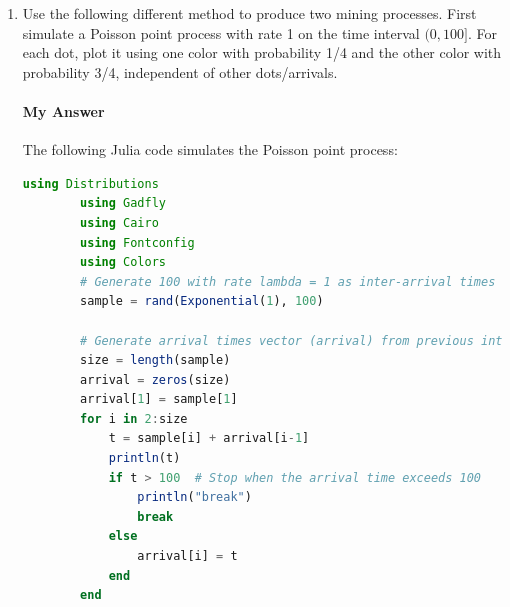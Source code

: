 \documentclass{article}
\begin{document}
\begin{enumerate}[label=(\alph*)]
\begin{lstlisting}[language=Julia, gobble=8]
        # Generate 100 with rate lambda = 3/4 (theta = 4/3) as inter-arrival times for 
        # at least 75 samples (n > 75) approximated by 100 time units multiplied by rate
        # (3/4 samples per time unit)
        sample2 = rand(Exponential(4/3), 90)
        size2 = length(sample2)
        arrival2 = zeros(size2)
        arrival2[1] = sample2[1]
        for i in 2:size2
            t2 = sample2[i] + arrival2[i-1]
            println(t2)
            if t2 > 100  # Stop when the arrival time exceeds 100
                println("break")
                break
            else
                arrival2[i] = t2
            end
        end
        
        
        # Plot the arrival times as red dots
        yaxis = zeros(length(arrival))
        yaxis2 = zeros(length(arrival2))
        p = Gadfly.plot(layer(x=arrival, y=yaxis, color=[RGBA(1,0,0,0.1)], Geom.point, Theme(point_size=1pt)),
            layer(x=arrival2, y=yaxis2, color=[RGBA(0,0,1,0.1)], Geom.point, Theme(point_size=1pt)),
            Guide.xlabel("Arrival Time"),
            Guide.manual_color_key("Process", ["with rate 1/4", "with rate 3/4"], ["red", "blue"])
            )
        display(p)
    \end{lstlisting}
    \item Use the following different method to produce two mining processes.  First simulate a Poisson point process with rate 1 on the time interval $(0,100]$\@.  For each dot, plot it using one color with probability 1/4 and the other color with probability 3/4, independent of other dots/arrivals.
    \paragraph{My Answer} The following Julia code simulates the Poisson point process:

    \begin{lstlisting}[language=Julia, gobble=8]
        using Distributions
        using Gadfly
        using Cairo
        using Fontconfig
        using Colors
        # Generate 100 with rate lambda = 1 as inter-arrival times for at least 100 samples (n > 100) approximated by 100 time units multiplied by rate (1 samples per time unit)
        sample = rand(Exponential(1), 100)
        
        # Generate arrival times vector (arrival) from previous inter-arrival times vector (intarrival)
        size = length(sample)
        arrival = zeros(size)
        arrival[1] = sample[1]
        for i in 2:size
            t = sample[i] + arrival[i-1]
            println(t)
            if t > 100  # Stop when the arrival time exceeds 100
                println("break")
                break
            else
                arrival[i] = t
            end
        end
        

\end{lstlisting}
\end{enumerate}
\end{document}
